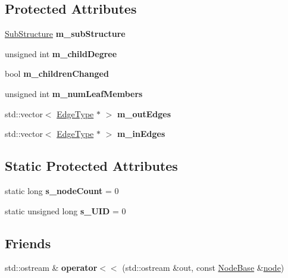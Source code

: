 \subsection*{Protected Attributes}
\begin{DoxyCompactItemize}
\item 
\mbox{\label{classNodeBase_ae55c5fac620af8dd6a15045cf02891b3}} 
\mbox{\hyperlink{structSubStructure}{Sub\+Structure}} {\bfseries m\+\_\+sub\+Structure}
\item 
\mbox{\label{classNodeBase_a08723bec28c9f903a95c9a1d5ddad86b}} 
unsigned int {\bfseries m\+\_\+child\+Degree}
\item 
\mbox{\label{classNodeBase_afa8f5bc0296f25caf3e22df4d5713e52}} 
bool {\bfseries m\+\_\+children\+Changed}
\item 
\mbox{\label{classNodeBase_ab0c208cdeb4e5437f368f23b7c18550a}} 
unsigned int {\bfseries m\+\_\+num\+Leaf\+Members}
\item 
\mbox{\label{classNodeBase_af0ec48764f60cf7ebddd7891bc938504}} 
std\+::vector$<$ \mbox{\hyperlink{classEdge}{Edge\+Type}} $\ast$ $>$ {\bfseries m\+\_\+out\+Edges}
\item 
\mbox{\label{classNodeBase_a6a5c771e1d0cd960cbfd07c9320597ea}} 
std\+::vector$<$ \mbox{\hyperlink{classEdge}{Edge\+Type}} $\ast$ $>$ {\bfseries m\+\_\+in\+Edges}
\end{DoxyCompactItemize}
\subsection*{Static Protected Attributes}
\begin{DoxyCompactItemize}
\item 
\mbox{\label{classNodeBase_a9501004a968d4293ab0a64883bddab09}} 
static long {\bfseries s\+\_\+node\+Count} = 0
\item 
\mbox{\label{classNodeBase_a5ec18c2269793b29333f716289b2fb2e}} 
static unsigned long {\bfseries s\+\_\+\+U\+ID} = 0
\end{DoxyCompactItemize}
\subsection*{Friends}
\begin{DoxyCompactItemize}
\item 
\mbox{\label{classNodeBase_a9a98c8838eccccbae50342272e59d38b}} 
std\+::ostream \& {\bfseries operator$<$$<$} (std\+::ostream \&out, const \mbox{\hyperlink{classNodeBase}{Node\+Base}} \&\mbox{\hyperlink{structnode}{node}})
\end{DoxyCompactItemize}


